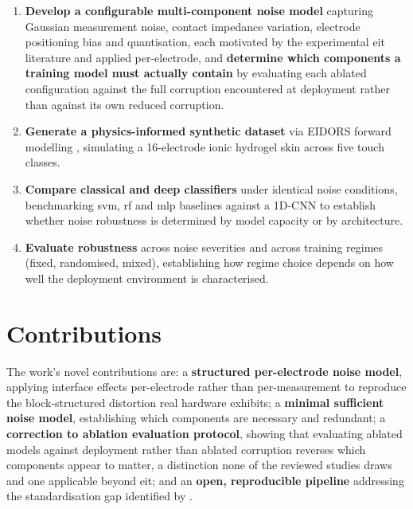 \begin{enumerate}
    \item \textbf{Develop a configurable multi-component noise model} capturing Gaussian measurement noise, contact impedance variation, electrode positioning bias and quantisation, each motivated by the experimental \gls{eit} literature \parencite{adler2006, vilhunen2002, kolehmainen1997} and applied per-electrode, and \textbf{determine which components a training model must actually contain} by evaluating each ablated configuration against the full corruption encountered at deployment rather than against its own reduced corruption.

    \item \textbf{Generate a physics-informed synthetic dataset} via EIDORS forward modelling \parencite{adler2006}, simulating a 16-electrode ionic hydrogel skin across five touch classes.

    \item \textbf{Compare classical and deep classifiers} under identical noise conditions, benchmarking \gls{svm}, \gls{rf} and \gls{mlp} baselines against a 1D-CNN to establish whether noise robustness is determined by model capacity or by architecture.

    \item \textbf{Evaluate robustness} across noise severities \parencite{hendrycks2019} and across training regimes (fixed, randomised, mixed), establishing how regime choice depends on how well the deployment environment is characterised.
\end{enumerate}

\section{Contributions}
\label{sec:intro-contributions}

The work's novel contributions are: a \textbf{structured per-electrode noise model}, applying interface effects per-electrode rather than per-measurement to reproduce the block-structured distortion real hardware exhibits; a \textbf{minimal sufficient noise model}, establishing which components are necessary and redundant; a \textbf{correction to ablation evaluation protocol}, showing that evaluating ablated models against deployment rather than ablated corruption reverses which components appear to matter, a distinction none of the reviewed studies draws and one applicable beyond \gls{eit}; and an \textbf{open, reproducible pipeline} addressing the standardisation gap identified by \textcite{koo2024}.

